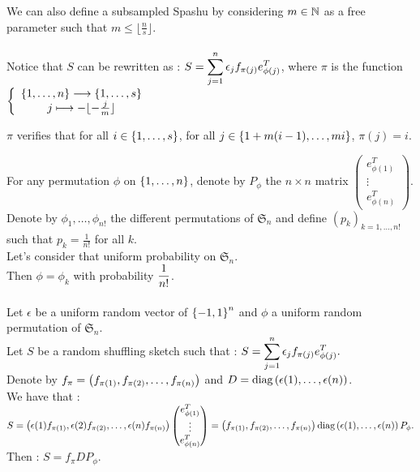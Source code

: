  We can also define a subsampled Spashu by considering $m \in {\mathbb N}$ as a free parameter such that $m \leq \lfloor \frac{n}{s} \rfloor.$\\\\
 
 
Notice that $S$ can be rewritten as : $S = \displaystyle\sum_{j=1}^{n} \epsilon_{j}f_{\pi(j)}e_{\phi(j)}^{T} $, where $\pi$ is the function $\left\{\begin{array}{c}\left\{1,\dots,n\right\}\longrightarrow \left\{1,\dots,s\right\}\\ j \longmapsto -\lfloor -\frac{j}{m} \rfloor\end{array}\right.$\\

 
 $\pi$ verifies that for all $i \in \left\{1,\dots,s\right\}$, for all $j \in \left\{1+m (i-1),\dots,m i\right\}$, $\pi(j) = i. $
 
 For any permutation $\phi$ on $\left\{1,\dots,n\right\}$, denote by $P_{\phi}$ the $n\times n$ matrix $ \begin{pmatrix} e_{\phi(1)}^{T} \\ \vdots \\ e_{\phi(n)}^{T} \end{pmatrix} $.\\
 Denote by $\phi_{1},\dots,\phi_{n!}$ the different permutations of $\mathfrak{S}_{n}$ and define $(p_{k})_{k=1,\dots,n!}$ such that $p_{k} = \frac{1}{n!}$ for all $k$.\\ Let's consider that uniform probability on $\mathfrak{S}_{n}$.\\ Then $\phi = \phi_{k}$ with probability $\displaystyle \frac{1}{n!}$.\\\\
 
 Let $\epsilon$ be a uniform random vector of $\left\{-1,1\right\}^{n}$ and $\phi$ a uniform random permutation of $\mathfrak{S}_{n}$.\\
Let $S$ be a random shuffling sketch such that : $S = \displaystyle\sum_{j=1}^{n} \epsilon_{j}f_{\pi(j)}e_{\phi(j)}^{T} .$\\

Denote by $f_{\pi} = \left( f_{\pi(1)}, f_{\pi(2)},\dots, f_{\pi(n)} \right)$ and $D = \text{diag}\left(\epsilon(1),\dots,\epsilon(n)\right)$.\\
We have that :\\
$S = \left( \epsilon(1)f_{\pi(1)},\epsilon(2)f_{\pi(2)},\dots,\epsilon(n)f_{\pi(n)} \right) \begin{pmatrix} e_{\phi(1)}^{T} \\ \vdots \\ e_{\phi(n)}^{T} \end{pmatrix} = \left( f_{\pi(1)}, f_{\pi(2)},\dots, f_{\pi(n)} \right) \text{diag}\left(\epsilon(1),\dots,\epsilon(n)\right) P_{\phi}.$\\
Then : $S = f_{\pi} D P_{\phi}$.\\

